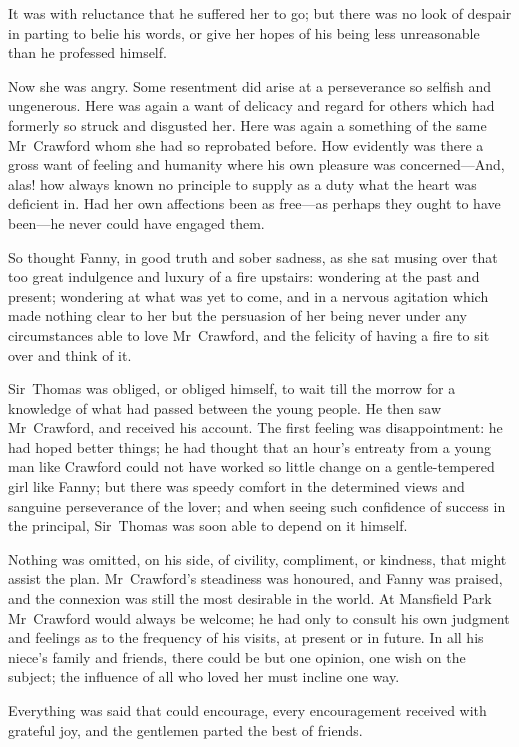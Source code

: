 It was with reluctance that he suffered her to go; but there was no look of despair in parting to belie his words, or give her hopes of his being less unreasonable than he professed himself.

Now she was angry. Some resentment did arise at a perseverance so selfish and ungenerous. Here was again a want of delicacy and regard for others which had formerly so struck and disgusted her. Here was again a something of the same Mr~Crawford whom she had so reprobated before. How evidently was there a gross want of feeling and humanity where his own pleasure was concerned—And, alas! how always known no principle to supply as a duty what the heart was deficient in. Had her own affections been as free—as perhaps they ought to have been—he never could have engaged them.

So thought Fanny, in good truth and sober sadness, as she sat musing over that too great indulgence and luxury of a fire upstairs: wondering at the past and present; wondering at what was yet to come, and in a nervous agitation which made nothing clear to her but the persuasion of her being never under any circumstances able to love Mr~Crawford, and the felicity of having a fire to sit over and think of it.

Sir~Thomas was obliged, or obliged himself, to wait till the morrow for a knowledge of what had passed between the young people. He then saw Mr~Crawford, and received his account. The first feeling was disappointment: he had hoped better things; he had thought that an hour's entreaty from a young man like Crawford could not have worked so little change on a gentle-tempered girl like Fanny; but there was speedy comfort in the determined views and sanguine perseverance of the lover; and when seeing such confidence of success in the principal, Sir~Thomas was soon able to depend on it himself.

Nothing was omitted, on his side, of civility, compliment, or kindness, that might assist the plan. Mr~Crawford's steadiness was honoured, and Fanny was praised, and the connexion was still the most desirable in the world. At Mansfield Park Mr~Crawford would always be welcome; he had only to consult his own judgment and feelings as to the frequency of his visits, at present or in future. In all his niece's family and friends, there could be but one opinion, one wish on the subject; the influence of all who loved her must incline one way.

Everything was said that could encourage, every encouragement received with grateful joy, and the gentlemen parted the best of friends.

